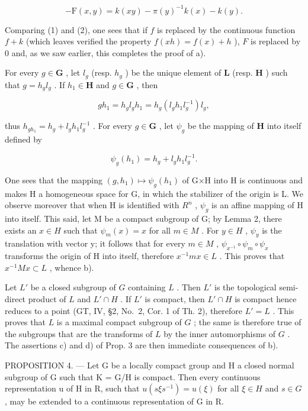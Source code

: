 \[
- \mathrm{F} (x, y) = k (x y) - \pi (y) ^ {- 1} k (x) - k (y).\tag{2}
\]

Comparing (1) and (2), one sees that if \(f\) is replaced by the continuous function \(f + k\) (which leaves verified the property \(f(xh) = f(x) + h\) ), \(F\) is replaced by 0 and, as we saw earlier, this completes the proof of a).

For every \(g \in \mathbf{G}\) , let \(l_g\) (resp. \(h_g\) ) be the unique element of \(\mathbf{L}\) (resp. \(\mathbf{H}\) ) such that \(g = h_g l_g\) . If \(h_1 \in \mathbf{H}\) and \(g \in \mathbf{G}\) , then

\[
g h _ {1} = h _ {g} l _ {g} h _ {1} = h _ {g} (l _ {g} h _ {1} l _ {g} ^ {- 1}) l _ {g},
\]

thus \(h_{gh_1} = h_g + l_g h_1 l_g^{-1}\) . For every \(g \in \mathbf{G}\) , let \(\psi_g\) be the mapping of \(\mathbf{H}\) into itself defined by

\[
\psi_ {g} (h _ {1}) = h _ {g} + l _ {g} h _ {1} l _ {g} ^ {- 1}.
\]

One sees that the mapping \((g,h_{1})\mapsto\psi_{g}(h_{1})\) of G×H into H is continuous and makes H a homogeneous space for G, in which the stabilizer of the origin is L. We observe moreover that when H is identified with \(R^{n}\) , \(\psi_{g}\) is an affine mapping of H into itself. This said, let M be a compact subgroup of G; by Lemma 2, there exists an \(x\in H\) such that \(\psi_{m}(x)=x\) for all \(m\in M\) . For \(y\in H\) , \(\psi_{y}\) is the translation with vector y; it follows that for every \(m\in M\) , \(\psi_{x^{-1}}\circ\psi_{m}\circ\psi_{x}\) transforms the origin of H into itself, therefore \(x^{-1}mx\in L\) . This proves that \(x^{-1}Mx\subset L\) , whence b).

Let \(L'\) be a closed subgroup of \(G\) containing \(L\) . Then \(L'\) is the topological semi-direct product of \(L\) and \(L' \cap H\) . If \(L'\) is compact, then \(L' \cap H\) is compact hence reduces to a point (GT, IV, §2, No.~2, Cor. 1 of Th. 2), therefore \(L' = L\) . This proves that \(L\) is a maximal compact subgroup of \(G\) ; the same is therefore true of the subgroups that are the transforms of \(L\) by the inner automorphisms of \(G\) . The assertions c) and d) of Prop. 3 are then immediate consequences of b).

PROPOSITION 4. --- Let G be a locally compact group and H a closed normal subgroup of G such that K = G/H is compact. Then every continuous representation u of H in R, such that \(u(s\xi s^{-1}) = u(\xi)\) for all \(\xi \in H\) and \(s \in G\) , may be extended to a continuous representation of G in R.


